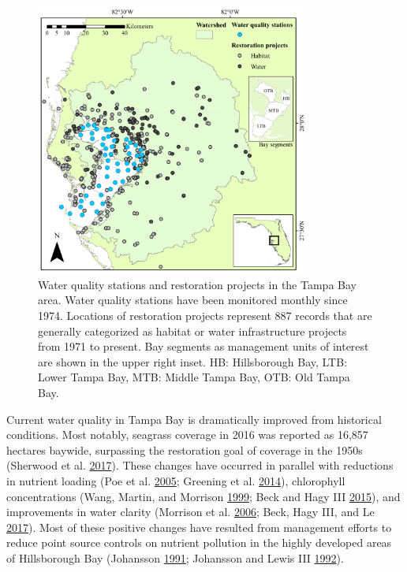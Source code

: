 \documentclass[]{article}
\begin{document}
\begin{figure}
\centerline{\includegraphics[width = 0.8\textwidth]{figs/tbrest_map.pdf}}
\caption{Water quality stations and restoration projects in the Tampa Bay area.  Water quality stations have been monitored monthly since 1974.  Locations of restoration projects represent 887 records that are generally categorized as habitat or water infrastructure projects from 1971 to present.  Bay segments as management units of interest are shown in the upper right inset. HB: Hillsborough Bay, LTB: Lower Tampa Bay, MTB: Middle Tampa Bay, OTB: Old Tampa Bay.}
\label{fig:map}
\end{figure}

Current water quality in Tampa Bay is dramatically improved from
historical conditions. Most notably, seagrass coverage in 2016 was
reported as 16,857 hectares baywide, surpassing the restoration goal of
coverage in the 1950s (Sherwood et al.
\protect\hyperlink{ref-Sherwood17}{2017}). These changes have occurred
in parallel with reductions in nutrient loading (Poe et al.
\protect\hyperlink{ref-Poe05}{2005}; Greening et al.
\protect\hyperlink{ref-Greening2014}{2014}), chlorophyll concentrations
(Wang, Martin, and Morrison \protect\hyperlink{ref-Wang99}{1999}; Beck
and Hagy III \protect\hyperlink{ref-Beck15}{2015}), and improvements in
water clarity (Morrison et al. \protect\hyperlink{ref-Morrison06}{2006};
Beck, Hagy III, and Le \protect\hyperlink{ref-Beck17c}{2017}). Most of
these positive changes have resulted from management efforts to reduce
point source controls on nutrient pollution in the highly developed
areas of Hillsborough Bay (Johansson
\protect\hyperlink{ref-Johansson91}{1991}; Johansson and Lewis III
\protect\hyperlink{ref-Johansson92}{1992}).
\end{document}
